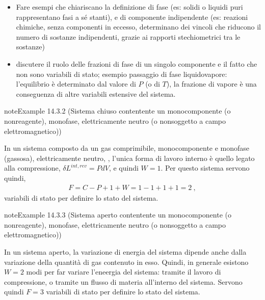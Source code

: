 \documentclass[letterpaper,10pt,italian]{jupyterBook}
\begin{document}
\sphinxAtStartPar
{}
\begin{itemize}
\item {} 
\sphinxAtStartPar
Fare esempi che chiariscano la definizione di fase (es: solidi o liquidi puri rappresentano fasi a sé stanti), e di componente indipendente (es: reazioni chimiche, senza componenti in eccesso, determinano dei vincoli che riducono il numero di sostanze indipendenti, grazie ai rapporti stechiometrici tra le sostanze)

\item {} 
\sphinxAtStartPar
discutere il ruolo delle frazioni di fase di un singolo componente e il fatto che non sono variabili di stato; esempio passaggio di fase liquido\sphinxhyphen{}vapore: l’equilibrio è determinato dal valore di \(P\) (o di \(T\)), la frazione di vapore è una conseguenza di altre variabili estensive del sistema.

\end{itemize}
\label{ch/thermodynamics/principles-gibbs-phase-rule:example-5}
\begin{sphinxadmonition}{note}{Example 14.3.2 (Sistema chiuso contentente un monocomponente (o non\sphinxhyphen{}reagente), monofase, elettricamente neutro (o non\sphinxhyphen{}soggetto a campo elettromagnetico))}



\sphinxAtStartPar
In un sistema composto da un gas comprimibile, monocomponente e monofase (gassosa), elettricamente neutro,  , l’unica forma di lavoro interno è quello legato alla compressione, \(\delta L^{int,rev} = P dV\), e quindi \(W = 1\). Per questo sistema servono quindi,
\begin{equation*}
\begin{split}F = C - P + 1 + W = 1 - 1 + 1 + 1 = 2 \ ,\end{split}
\end{equation*}
\sphinxAtStartPar
variabili di stato per definire lo stato del sistema.
\end{sphinxadmonition}
\label{ch/thermodynamics/principles-gibbs-phase-rule:example-6}
\begin{sphinxadmonition}{note}{Example 14.3.3 (Sistema aperto contentente un monocomponente (o non\sphinxhyphen{}reagente), monofase, elettricamente neutro (o non\sphinxhyphen{}soggetto a campo elettromagnetico))}



\sphinxAtStartPar
In un sistema aperto, la variazione di energia del sistema dipende anche dalla variazione della quantità di gas contenuto in esso. Quindi, in generale esistono \(W = 2\) modi per far variare l’eneergia del sistema: tramite il lavoro di compressione, o tramite un flusso di materia all’interno del sistema. Servono quindi \(F=3\) variabili di stato per definire lo stato del sistema.
\end{sphinxadmonition}
\end{document}
